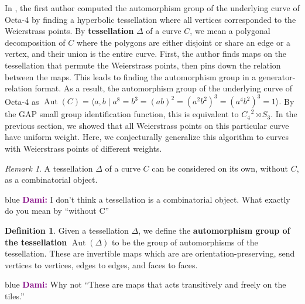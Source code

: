 \documentclass[12pt,reqno]{amsart}
\newenvironment{dami}{
  \medskip
\begin{color}{blue}
    \textcolor{purple}{\textbf{Dami:}} 
}{
\end{color}
  \medskip
}
\DeclareMathOperator{\Aut}{Aut}
\theoremstyle{definition}
\newtheorem{defn}{Definition}
\theoremstyle{remark}
\newtheorem*{remark}{Remark}
\begin{document}
In \cite{dami}, the first author computed the automorphism group of the underlying curve of Octa-4 by finding a hyperbolic tessellation where all vertices corresponded to the Weierstrass points. By \textbf{tessellation} $\Delta$ of a curve $C$, we mean a polygonal decomposition of $C$ where the polygons are either disjoint or share an edge or a vertex, and their union is the entire curve. First, the author finds maps on the tessellation that permute the Weierstrass points, then pins down the relation between the maps. This leads to finding the automorphism group in a generator-relation format. As a result, the automorphism group of the underlying curve of Octa-4 as $\Aut(C) = \langle a, b \mid a^8 = b^3 = (ab) ^2 = (a^2b^2)^3 = (a^4b^2)^3 = 1 \rangle.$ By the GAP small group identification function, this is equivalent to $C_4^{\text{ }2} \rtimes S_3.$ In the previous section, we showed that all Weierstrass points on this particular curve have uniform weight. Here, we conjecturally generalize this algorithm to curves with Weierstrass points of different weights. 


\begin{remark} A tessellation $\Delta$ of a curve $C$ can be considered on its own, without $C$, as a combinatorial object. \end{remark}
\begin{dami} I don't think a tessellation is a combinatorial object. What exactly do you mean by ``without C''\end{dami}

\begin{defn} Given a tessellation $\Delta$, we define the \textbf{automorphism group of the tessellation} $\Aut(\Delta)$ to be the group of automorphisms of the tessellation. These are invertible maps which are are orientation-preserving, send vertices to vertices, edges to edges, and faces to faces. \end{defn} 

\begin{dami} Why not ``These are maps that acts transitively and freely on the tiles.''\end{dami}


\end{document}
